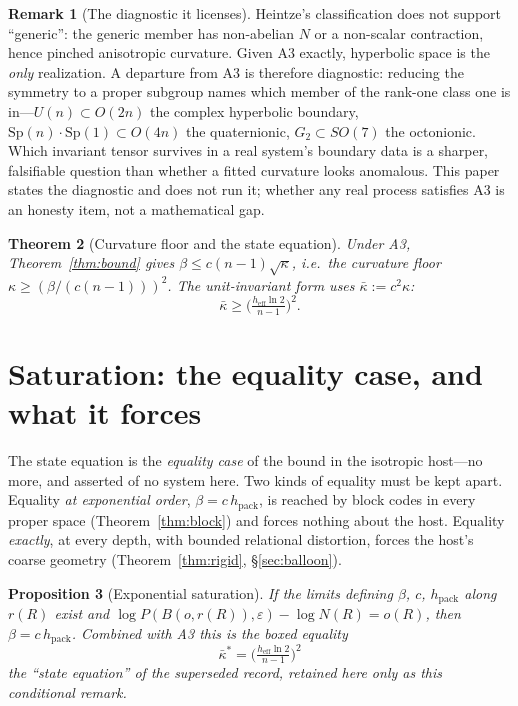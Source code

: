 \documentclass[11pt,reqno]{amsart}
\theoremstyle{plain}
\newtheorem{theorem}{Theorem}[section]
\newtheorem{proposition}[theorem]{Proposition}
\theoremstyle{definition}
\newtheorem{remark}[theorem]{Remark}
\newcommand{\hpack}{h_{\mathrm{pack}}}
\newcommand{\heff}{h_{\mathrm{eff}}}
\newcommand{\eps}{\varepsilon}
\begin{document}
\begin{remark}[The diagnostic it licenses]\label{rem:diagnostic}
Heintze's classification does not support ``generic'': the generic member has non-abelian $N$ or a non-scalar contraction, hence pinched anisotropic curvature. Given A3 exactly, hyperbolic space is the \emph{only} realization. A departure from A3 is therefore diagnostic: reducing the symmetry to a proper subgroup names which member of the rank-one class one is in---$U(n)\subset O(2n)$ the complex hyperbolic boundary, $\mathrm{Sp}(n)\!\cdot\!\mathrm{Sp}(1)\subset O(4n)$ the quaternionic, $G_2\subset SO(7)$ the octonionic. Which invariant tensor survives in a real system's boundary data is a sharper, falsifiable question than whether a fitted curvature looks anomalous. This paper states the diagnostic and does not run it; whether any real process satisfies A3 is an honesty item, not a mathematical gap.
\end{remark}

\begin{theorem}[Curvature floor and the state equation]\label{thm:floor}
Under A3, Theorem~\ref{thm:bound} gives $\beta\le c(n-1)\sqrt\kappa$, i.e.\ the curvature floor $\kappa\ge(\beta/(c(n-1)))^2$. The unit-invariant form uses $\bar\kappa:=c^2\kappa$:
\[
\bar\kappa\ge\Big(\tfrac{\heff\ln2}{n-1}\Big)^2.
\]
\end{theorem}

\section{Saturation: the equality case, and what it forces}\label{sec:IIb}

The state equation is the \emph{equality case} of the bound in the isotropic host---no more, and asserted of no system here. Two kinds of equality must be kept apart. Equality \emph{at exponential order}, $\beta=c\,\hpack$, is reached by block codes in every proper space (Theorem~\ref{thm:block}) and forces nothing about the host. Equality \emph{exactly}, at every depth, with bounded relational distortion, forces the host's coarse geometry (Theorem~\ref{thm:rigid}, \S\ref{sec:balloon}).

\begin{proposition}[Exponential saturation]\label{prop:sat}
If the limits defining $\beta$, $c$, $\hpack$ along $r(R)$ exist and $\log P(B(o,r(R)),\eps)-\log N(R)=o(R)$, then $\beta=c\,\hpack$. Combined with A3 this is the boxed equality
\[
\boxed{\ \bar\kappa^*=\Big(\tfrac{\heff\ln2}{n-1}\Big)^2\ }
\]
the ``state equation'' of the superseded record, retained here only as this conditional remark.
\end{proposition}
\end{document}
